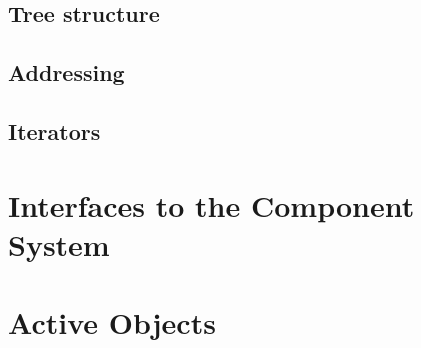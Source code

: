 \documentclass[12pt]{scrartcl}
\begin{document}

\subsection{Tree structure} 



\subsection{Addressing}





\subsection{Iterators}





\section{Interfaces to the Component System}



\section{Active Objects} 





\end{document}
